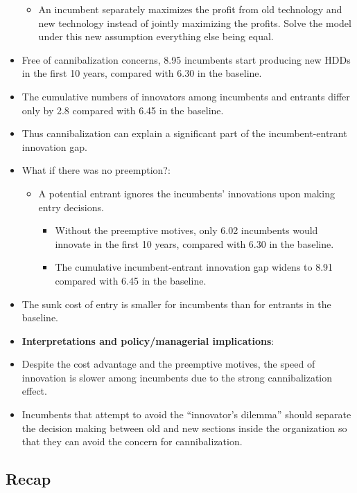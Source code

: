 \documentclass[
]{book}
\providecommand{\tightlist}{%
  \setlength{\itemsep}{0pt}\setlength{\parskip}{0pt}}
\begin{document}
\begin{itemize}
  \begin{itemize}
  \tightlist
  \item
    An incumbent separately maximizes the profit from old technology and new technology instead of jointly maximizing the profits. Solve the model under this new assumption everything else being equal.
  \end{itemize}
\item
  Free of cannibalization concerns, 8.95 incumbents start producing new HDDs in the first 10 years, compared with 6.30 in the baseline.
\item
  The cumulative numbers of innovators among incumbents and entrants differ only by 2.8 compared with 6.45 in the baseline.
\item
  Thus cannibalization can explain a significant part of the incumbent-entrant innovation gap.
\item
  What if there was no preemption?:

  \begin{itemize}
  \tightlist
  \item
    A potential entrant ignores the incumbents' innovations upon making entry decisions.

    \begin{itemize}
    \tightlist
    \item
      Without the preemptive motives, only 6.02 incumbents would innovate in the first 10 years, compared with 6.30 in the baseline.
    \item
      The cumulative incumbent-entrant innovation gap widens to 8.91 compared with 6.45 in the baseline.
    \end{itemize}
  \end{itemize}
\item
  The sunk cost of entry is smaller for incumbents than for entrants in the baseline.
\item
  \textbf{Interpretations and policy/managerial implications}:
\item
  Despite the cost advantage and the preemptive motives, the speed of innovation is slower among incumbents due to the strong cannibalization effect.
\item
  Incumbents that attempt to avoid the ``innovator's dilemma'' should separate the decision making between old and new sections inside the organization so that they can avoid the concern for cannibalization.
\end{itemize}

\hypertarget{recap}{%
\subsection{Recap}\label{recap}}
\end{document}
